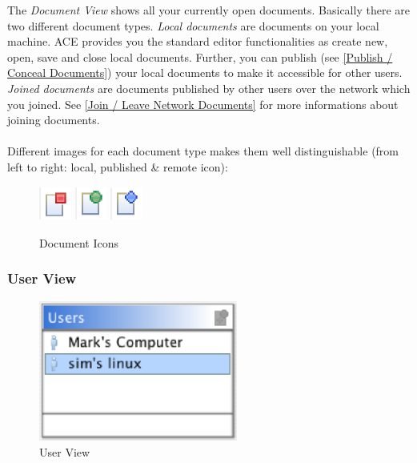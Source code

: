 \documentclass[11pt,a4paper]{article}
\begin{document}
The \textit{Document View} shows all your currently open documents. Basically there are two different document types. \textit{Local documents} are documents on your local machine. ACE provides you the standard editor functionalities as create new, open, save and close local documents. Further, you can publish (see \ref{Publish / Conceal Documents}) your local documents to make it accessible for other users. \textit{Joined documents} are documents published by other users over the network which you joined. See \ref{Join / Leave Network Documents} for more informations about joining documents. \\
\\
Different images for each document type makes them well distinguishable (from left to right: local, published \& remote icon):

\begin{figure}[H]
\begin{center}
  \includegraphics[height=32pt, width=30pt]{../images/usermanual/icon_local.eps}
\vspace{24pt}
  \includegraphics[height=32pt, width=30pt]{../images/usermanual/icon_published.eps}
\vspace{24pt}
  \includegraphics[height=32pt, width=30pt]{../images/usermanual/icon_remote.eps}
\caption{Document Icons}
\label{default}
\end{center}
\end{figure}

\subsubsection{User View}
\begin{figure}[H]
\begin{center}
  \includegraphics[height=1.82in, width=2.57in]{../images/usermanual/uview_overview.eps}
\caption{User View}
\label{default}
\end{center}
\end{figure}
\end{document}
